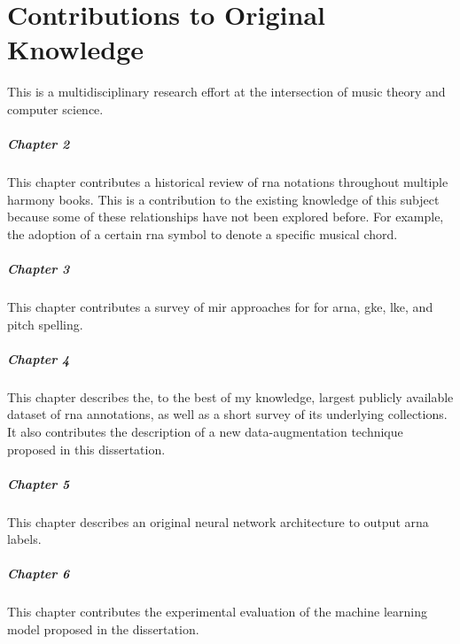 \chapter*{Contributions to Original Knowledge}
\label{chap:contributionstoknowledge}

This \thesisdiss{} is a multidisciplinary research effort at
the intersection of music theory and computer science.

\paragraph{Chapter 2}

This chapter contributes a historical review of \gls{rna}
notations throughout multiple harmony books. This is a
contribution to the existing knowledge of this subject
because some of these relationships have not been explored
before. For example, the adoption of a certain \gls{rna}
symbol to denote a specific musical chord.

\paragraph{Chapter 3}

This chapter contributes a survey of \gls{mir} approaches
for for \gls{arna}, \gls{gke}, \gls{lke}, and pitch
spelling. 

\paragraph{Chapter 4}

This chapter describes the, to the best of my knowledge,
largest publicly available dataset of \gls{rna} annotations,
as well as a short survey of its underlying collections. It
also contributes the description of a new data-augmentation
technique proposed in this dissertation.

\paragraph{Chapter 5}

This chapter describes an original neural network
architecture to output \gls{arna} labels.

\paragraph{Chapter 6}

This chapter contributes the experimental evaluation of the
machine learning model proposed in the dissertation. 

